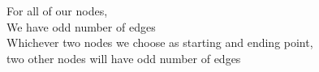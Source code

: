 \documentclass[preview]{standalone}
\begin{document}
\begin{center}
For all of our nodes, \\ We have odd number of edges \\ Whichever two nodes we choose as starting and ending point, \\ two other nodes will have odd number of edges
\end{center}
\end{document}
